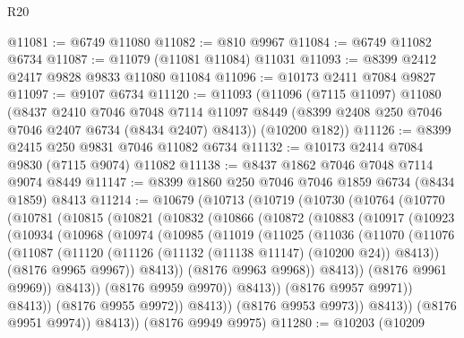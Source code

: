 \begin{lexlean}{R20}
\begin{coremodule}
{@11081 := @6749 @11080
@11082 := @810 @9967
@11084 := @6749 @11082 @6734
@11087 := @11079 (@11081 @11084) @11031
@11093 := @8399 @2412 @2417 @9828 @9833 @11080 @11084
@11096 := @10173 @2411 @7084 @9827
@11097 := @9107 @6734
@11120 := @11093
    (@11096
      (@7115 @11097)
      @11080
      (@8437
        @2410
        @7046
        @7048
        @7114
        @11097
        @8449
        (@8399 @2408 @250 @7046 @7046 @2407 @6734 (@8434 @2407) @8413))
      (@10200 @182))
@11126 := @8399 @2415 @250 @9831 @7046 @11082 @6734
@11132 := @10173 @2414 @7084 @9830 (@7115 @9074) @11082
@11138 := @8437 @1862 @7046 @7048 @7114 @9074 @8449
@11147 := @8399 @1860 @250 @7046 @7046 @1859 @6734 (@8434 @1859) @8413
@11214 := @10679
    (@10713
      (@10719
        (@10730
          (@10764
            (@10770
              (@10781
                (@10815
                  (@10821
                    (@10832
                      (@10866
                        (@10872
                          (@10883
                            (@10917
                              (@10923
                                (@10934
                                  (@10968
                                    (@10974
                                      (@10985
                                        (@11019
                                          (@11025
                                            (@11036
                                              (@11070
                                                (@11076
                                                  (@11087
                                                    (@11120
                                                      (@11126
                                                        (@11132 (@11138 @11147) (@10200 @24))
                                                        @8413))
                                                    (@8176 @9965 @9967))
                                                  @8413))
                                              (@8176 @9963 @9968))
                                            @8413))
                                        (@8176 @9961 @9969))
                                      @8413))
                                  (@8176 @9959 @9970))
                                @8413))
                            (@8176 @9957 @9971))
                          @8413))
                      (@8176 @9955 @9972))
                    @8413))
                (@8176 @9953 @9973))
              @8413))
          (@8176 @9951 @9974))
        @8413))
    (@8176 @9949 @9975)
@11280 := @10203
    (@10209
}
\end{coremodule}
\end{lexlean}
